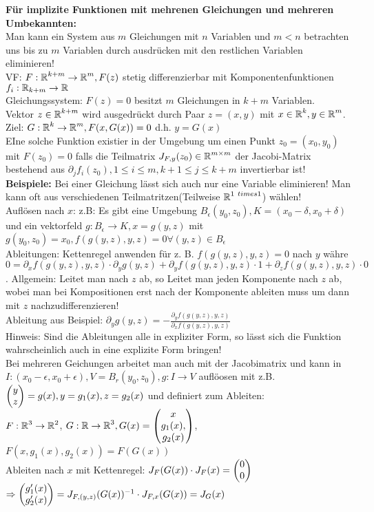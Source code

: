 \documentclass[german]{latex4ei/latex4ei_sheet}
\begin{document}
\textbf{F\"ur implizite Funktionen mit mehrenen Gleichungen und mehreren Umbekannten:}\\
Man kann ein System aus $m$ Gleichungen mit $n$ Variablen und $m<n$ betrachten uns bis zu $m$ Variablen durch ausdr\"ucken mit den restlichen Variablen eliminieren!\\
VF: $F:\operatorname{\mathbb R}^{k+m}\to\operatorname{\mathbb R}^m, F(z)$ stetig differenzierbar mit Komponentenfunktionen $f_i:\operatorname{\mathbb R}_{k+m}\to \operatorname{\mathbb R}$\\
Gleichungssystem: $F(z)=0$ besitzt $m$ Gleichungen in $k+m$ Variablen.\\
Vektor $z\in\operatorname{\mathbb R}^{k+m}$ wird ausgedr\"uckt durch Paar $z=(x , y)$ mit $x\in\operatorname{\mathbb R}^k,y\in\operatorname{\mathbb R}^m$.
Ziel: $G:\operatorname{\mathbb R}^k\to\operatorname{\mathbb R}^m, F(x,G(x))=0$ d.h. $y=G(x)$\\
EIne solche Funktion existier in der Umgebung um einen Punkt $z_0=(x_0,y_0)$ mit $F(z_0)=0$ falls die Teilmatrix $J_{F,y}(z_0)\in\operatorname{\mathbb R}^{m \times m}$ der Jacobi-Matrix bestehend aus $\partial_j f_i(z_0), 1\le i \le m, k+1\le j \le k+m$ invertierbar ist!\\
\textbf{Beispiele:} Bei einer Gleichung l\"asst sich auch nur eine Variable eliminieren! Man kann oft aus verschiedenen Teilmatritzen(Teilweise $\operatorname{\mathbb R}^{1\ times 1}$) w\"ahlen!\\
Aufl\"osen nach $x$: z.B: Es gibt eine Umgebung $B_\epsilon(y_0,z_0), K=(x_0-\delta,x_0+\delta)$ und ein vektorfeld $g:B_\epsilon \to K, x=g(y,z)$ mit $g(y_0,z_0)=x_0, f(g(y,z),y,z)=0 \forall (y,z) \in B_\epsilon$\\
Ableitungen: Kettenregel anwenden f\"ur z. B. $f(g(y,z),y,z)=0$ nach $y$ w\"ahre $0=\partial_x f(g(y,z),y,z)\cdot \partial_y g(y,z)+\partial_y f(g(y,z),y,z)\cdot 1 + \partial_z f(g(y,z),y,z) \cdot 0$. Allgemein: Leitet man nach $z$ ab, so Leitet man jeden Komponente nach $z$ ab, wobei man bei Kompositionen erst nach der Komponente ableiten muss um dann mit $z$ nachzudifferenzieren!\\
Ableitung aus Beispiel: $\partial_y g(y,z)=-\frac{\partial_y f(g(y,z),y,z)}{\partial_x f(g(y,z),y,z)}$\\
Hinweis: Sind die Ableitungen alle in expliziter Form, so l\"asst sich die Funktion wahrscheinlich auch in eine explizite Form bringen!\\
Bei mehreren Geichungen arbeitet man auch mit der Jacobimatrix und kann in $I:(x_0-\epsilon,x_0+\epsilon), V=B_r(y_0,z_0), g: I \to V$ aufl\"oosen mit z.B. $\begin{pmatrix} y \\ z \end{pmatrix}=g(x),y=g_1(x),z=g_2(x)$ und definiert zum Ableiten:\\
$F:\operatorname{\mathbb R}^3\to\operatorname{\mathbb R}^2$, $G:\operatorname{\mathbb R}\to\operatorname{\mathbb R}^3, G(x)=\begin{pmatrix} x \\ g_1(x), \\g_2(x) \end{pmatrix}$, $F(x,g_1(x),g_2(x))=F(G(x))$\\
Ableiten nach $x$ mit Kettenregel: $J_F(G(x))\cdot J_F(x)=\begin{pmatrix} 0 \\ 0 \end{pmatrix}$\\
$\Rightarrow \begin{pmatrix} g_1'(x)\\g_2'(x) \end{pmatrix}=J_{F,(y,z)}(G(x))^{-1} \cdot J_{F,x}(G(x))=J_G(x)$
\end{document}

